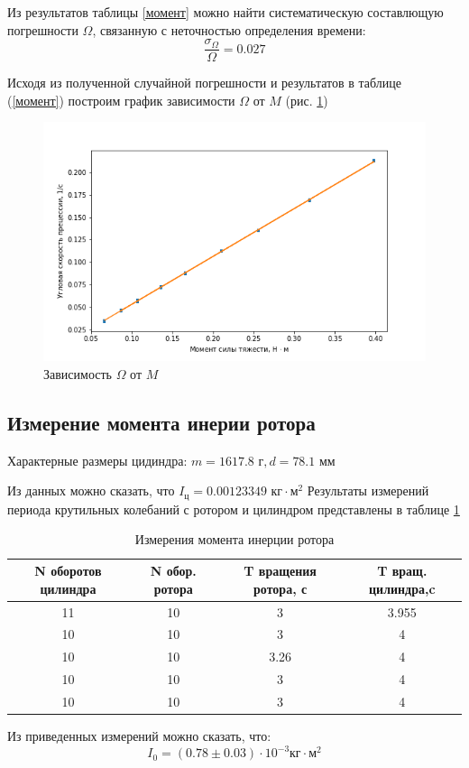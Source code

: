 \documentclass[a4paper,12pt]{article} %
\begin{document}
Из результатов таблицы \ref{момент} можно найти систематическую составлющую погрешности $\Omega$, связанную с неточностью определения времени:
\begin{equation}
\frac{\sigma_\Omega}{\Omega}= 0.027
\end{equation}

Исходя из полученной случайной погрешности и результатов в таблице (\ref{момент}) построим график зависимости $\Omega$ от $M$ (рис. \ref{график})
\begin{figure}[h!]
\begin{center}
\includegraphics[width=\textwidth]{График}
\end{center}
\caption{Зависимость $\Omega$ от $M$} \label{график}
\end{figure}

\subsection{Измерение момента инерии ротора}

Характерные размеры цидиндра: $m = 1617.8 \text{ г}, d = 78.1 \text{ мм} $ 

Из данных можно сказать, что $I_ \text{ц} = 0.00123349
 \text{ кг} \cdot \text{м}^2$
Результаты измерений периода крутильных колебаний с ротором и цилиндром представлены в таблице \ref{инерция}

\begin{table} \caption{Измерения момента инерции ротора}
\label{инерция} \begin{tabular}{|c|c|c|c|} \hline N оборотов цилиндра & N обор. ротора & T вращения ротора, с & T вращ. цилиндра,c \\ \hline 11 & 10 & 3 & 3.955 \\ \hline 10 & 10 & 3 & 4 \\ \hline 10 & 10 & 3.26 & 4 \\ \hline 10 & 10 & 3 & 4 \\ \hline 10 & 10 & 3 & 4 \\ \hline \end{tabular} \end{table}
Из приведенных измерений можно сказать, что:
\begin{equation}
I_0 = (0.78 \pm   0.03)\cdot 10^{-3} \text{кг} \cdot \text{м}^2
\end{equation}
\end{document}
